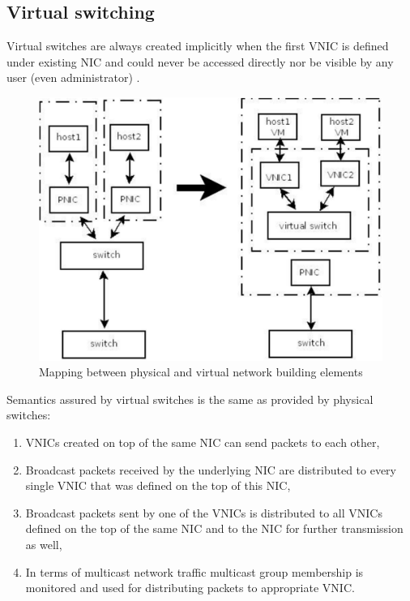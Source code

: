 \documentclass[11pt]{book}
\begin{document}
      \subsection{Virtual switching}
        
        Virtual switches are always created implicitly when the first VNIC is defined under existing NIC and could never
        be accessed directly nor be visible by any user (even administrator) \cite{crossbow2}. 
        
        \begin{figure}[H]
          \begin{center}
            \includegraphics[width=.7\textwidth]{img/physical_and_virtual_switches_mapping.pdf}
          \end{center}

          \caption{Mapping between physical and virtual network building elements}
        \end{figure}
        
        Semantics assured by virtual switches is the same as provided by physical switches: 

        \begin{enumerate}
          \item VNICs created on top of the same NIC can send packets to each other,
          \item Broadcast packets received by the underlying NIC are distributed to every single VNIC that was defined
                on the top of this NIC,
          \item Broadcast packets sent by one of the VNICs is distributed to all VNICs defined on the top of the same
                NIC and to the NIC for further transmission as well,
          \item In terms of multicast network traffic multicast group membership is monitored and used for distributing
                packets to appropriate VNIC.
        \end{enumerate}
\end{document}
